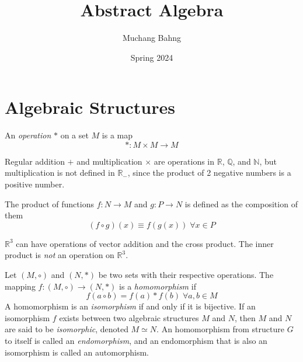 \documentclass{article}
\begin{document}
\title{Abstract Algebra}
\author{Muchang Bahng}
\date{Spring 2024}

\maketitle
\tableofcontents
\pagebreak

\section{Algebraic Structures}

    \begin{definition}
      An \textit{operation} $*$ on a set $M$ is a map 
      \begin{equation}
         \ast : M \times M \longrightarrow M
      \end{equation}
    \end{definition}

    \begin{example}
      Regular addition $+$ and multiplication $\times$ are operations in $\mathbb{R}$, $\mathbb{Q}$, and $\mathbb{N}$, but multiplication is not defined in $\mathbb{R_{-}}$, since the product of 2 negative numbers is a positive number. 
      \end{example}

    \begin{example}
      The product of functions $f: N \longrightarrow M$ and $g: P \longrightarrow N$ is defined as the composition of them
      \begin{equation}
        (f \circ g)(x) \equiv f(g(x)) \; \forall x\in P
      \end{equation}
    \end{example}

    \begin{example}
      $\mathbb{R}^{3}$ can have operations of vector addition and the cross product. The inner product is \textit{not} an operation on $\mathbb{R}^3$.
    \end{example}

    \begin{definition}
      Let $(M, \circ)$ and $(N, *)$ be two sets with their respective operations. The mapping $f: (M, \circ) \longrightarrow (N, *)$ is a \textit{homomorphism} if
      \begin{equation}
        f(a \circ b) = f(a) * f(b) \; \forall a, b \in M
      \end{equation}
      A homomorphism is an \textit{isomorphism} if and only if it is bijective. If an isomorphism $f$ exists between two algebraic structures $M$ and $N$, then $M$ and $N$ are said to be \textit{isomorphic}, denoted $M \simeq N$. An homomorphism from structure $G$ to itself is called an \textit{endomorphism}, and an endomorphism that is also an isomorphism is called an automorphism. 
    \end{definition}
\end{document}
